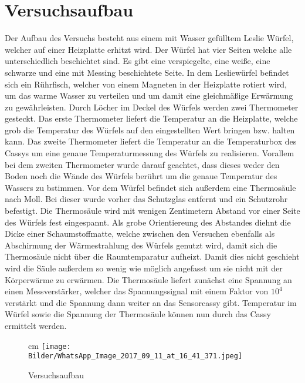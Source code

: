 \documentclass[a4paper, 11pt]{article}
\begin{document}
\section{Versuchsaufbau}
Der Aufbau des Versuchs besteht aus einem mit Wasser gefülltem Leslie Würfel, welcher auf einer Heizplatte erhitzt wird. Der Würfel hat vier Seiten welche alle unterschiedlich beschichtet sind. Es gibt eine verspiegelte, eine weiße, eine schwarze und eine mit Messing beschichtete Seite. In dem Lesliewürfel befindet sich ein Rührfisch, welcher von einem Magneten in der Heizplatte rotiert wird, um das warme Wasser zu verteilen und um damit eine gleichmäßige Erwärmung zu gewährleisten. Durch Löcher im Deckel des Würfels werden zwei Thermometer gesteckt. Das erste Thermometer liefert die Temperatur an die Heizplatte, welche grob die Temperatur des Würfels auf den eingestellten Wert bringen bzw. halten kann. Das zweite Thermometer liefert die Temperatur an die Temperaturbox des Cassys um eine genaue Temperaturmessung des Würfels zu realisieren. Vorallem bei dem zweiten Thermometer wurde darauf geachtet, dass dieses weder den Boden noch die Wände des Würfels berührt um die genaue Temperatur des Wassers zu bstimmen.
Vor dem Würfel befindet sich außerdem eine Thermosäule nach Moll. Bei dieser wurde vorher das Schutzglas entfernt und ein Schutzrohr befestigt.
Die Thermosäule wird mit wenigen Zentimetern Abstand vor einer Seite des Würfels fest eingespannt. Als grobe Orientiereung des Abstandes diehnt die Dicke einer Schaumstoffmatte, welche zwischen den Versuchen ebenfalls als Abschirmung der Wärmestrahlung des Würfels genutzt wird, damit sich die Thermosäule nicht über die Raumtemparatur aufheizt. Damit dies nicht geschieht wird die Säule außerdem so wenig wie möglich angefasst um sie nicht mit der Körperwärme zu erwärmen.
Die Thermosäule liefert zunächst eine Spannung an einen Messverstärker, welcher das Spannungssignal mit einem Faktor von $10^4$ verstärkt und die Spannung dann weiter an das Sensorcassy gibt.
Temperatur im Würfel sowie die Spannung der Thermosäule können nun durch das Cassy ermittelt werden.\newline
\begin{figure}[H]

	 cm
	\texttt{[image: Bilder/WhatsApp\_Image\_2017\_09\_11\_at\_16\_41\_371.jpeg]}%
	\caption[Versuchsaufbau]{Versuchsaufbau}%
	\label{pic:Abbildung 2}%

\end{figure}
\end{document}
